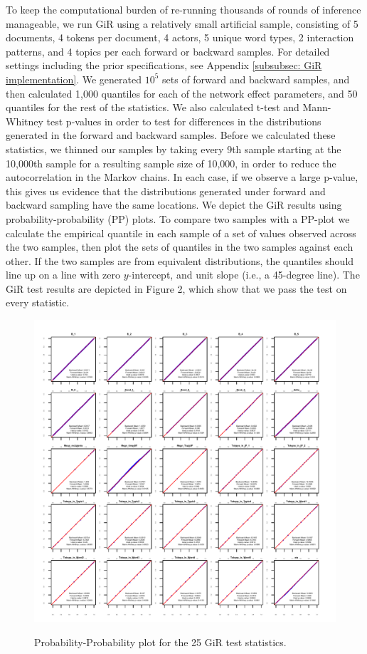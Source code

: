 To keep the computational burden of re-running thousands of rounds of inference manageable, we run GiR using a relatively small artificial sample, consisting of 5 documents, 4 tokens per document, 4 actors, 5 unique word types, 2 interaction patterns, and 4 topics per each forward or backward samples. For detailed settings including the prior specifications, see Appendix \ref{subsubsec: GiR implementation}. 
We generated $10^5$ sets of forward and backward samples, and then calculated 1,000 quantiles for each of the network effect parameters, and 50 quantiles for the rest of the statistics. We also calculated t-test and Mann-Whitney test p-values in order to test for differences in the distributions generated in the forward and backward samples. Before we calculated these statistics, we thinned our samples 
by taking every 9th sample starting at the 10,000th sample for a resulting sample size of 10,000, in order to reduce the autocorrelation in the Markov chains. In each case, if we observe a large p-value, this gives us evidence that the distributions generated under forward and backward sampling have the same locations. We depict the GiR results using probability-probability (PP) plots. To compare two samples with a PP-plot we calculate the empirical quantile in each sample of a set of values observed across the two samples, then plot the sets of quantiles in the two samples against each other. If the two samples are from equivalent distributions, the quantiles should line up on a line with zero $y$-intercept, and unit slope (i.e., a 45-degree line). The GiR test results are depicted in Figure 2, which show that we pass the test on every statistic.
\begin{figure}[H]
	\centering
	\includegraphics[width=1\textwidth]{plots/GiReta.pdf} 
	\label{fig:PPplot}
	\caption{Probability-Probability plot for the 25 GiR test statistics.}
\end{figure}
